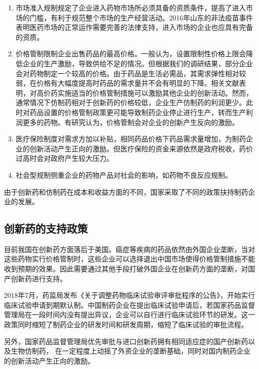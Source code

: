 \documentclass[twocolumn,openany]{ctexbook}
\begin{document}
			
			\begin{enumerate}
				\item 市场准入规制规定了企业进入药物市场所必须具备的资质条件，提高了进入市场的门槛，有利于规范整个市场的生产经营活动。2016年山东的非法疫苗事件表明医药市场的正常运作需要完善的法律支持，进入市场的企业也应具有完备的资质。
				
				\item 价格管制限制企业出售药品的最高价格。一般认为，设置限制性价格上限会降低企业的生产激励，导致供给不足的情况。但根据我们的调研结果，部分企业会对药物制定一个较高的价格。由于药品是生活必需品，其需求弹性相对较弱，在价格有大幅度提高时药品的需求量并不会有明显的下降。相关文献表明，对高价药实施适当的价格管制措施可以激励其他企业的创新活动\citep{RN28}。然而，通常情况下仿制药相对于创新药的价格较低，企业生产仿制药的利润更少。此时对药品设置的价格管制政策更可能导致制药企业停止进行生产，转而生产利润更多的药物。有研究认为，价格管制会对企业的创新产生反向的激励\citep{RN27}。
				
				\item 医疗保险制度对需求方加以补贴，相同药品价格下药品需求量增加，为制药企业的创新活动产生正向的激励。但医疗保险的资金来源依然是政府税收，药价过高时会对政府产生较大压力。
				
				\item 社会型规制侧重企业的药物产品对社会的影响，如药物不良反应规制。
			\end{enumerate}
			
			由于创新药和仿制药在成本和收益方面的不同，国家采取了不同的政策扶持制药企业的发展。
			
			\subsection{创新药的支持政策}
			
			目前我国在创新药方面落后于美国。癌症等疾病的药品依然由外国企业垄断，当对这些药物实行价格管制时，这些企业可以选择退出中国市场使得价格管制措施不能收到预期的效果。因此需要通过其他手段打破外国企业在创新药方面的垄断，对国产创新药进行支持\citep{RN11}。
			
			2018年7月，药监局发布《关于调整药物临床试验审评审批程序的公告》，开始实行临床试验申请到期默认制。中国制药企业在提出临床试验申请后，若国家药品监督管理局在一段时间内没有提出异议，企业可以自行进行临床试验环节的研发。这一政策同时缩短了制药企业的研发时间和研发周期，缩短了临床试验的审批流程。
			
			另外，国家药品监督管理局优先审批与进口创新药拥有相同适应症的国产创新药以及生物仿制药，%
			在一定程度上动摇了外资企业的垄断基础，同时对国内制药企业的创新活动产生正向的激励。
			
\end{document}
